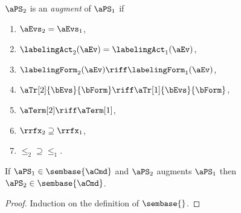 \begin{definition}
  \label{def:augment}
  $\aPS_2$ is an \emph{augment} of $\aPS_1$ if
  \begin{multicols}{4}
    \begin{enumerate}
    \item $\aEvs_2=\aEvs_1$,
    \item $\labelingAct_2(\aEv)=\labelingAct_1(\aEv)$,
    \item $\labelingForm_2(\aEv) \riff \labelingForm_1(\aEv)$,
    \item $\aTr[2]{\bEvs}{\bForm}\riff \aTr[1]{\bEvs}{\bForm}$,
    \item $\aTerm[2] \riff \aTerm[1]$,
    \item ${\rrfx_2}\supseteq{\rrfx_1}$,
    \item ${\le_2}\supseteq{\le_1}$.
    \end{enumerate}
  \end{multicols}
\end{definition}
\begin{lemma}
  If $\aPS_1\in\sembase{\aCmd}$ and $\aPS_2$  augments $\aPS_1$ then $\aPS_2\in\sembase{\aCmd}$.

  \vspace{-.5\baselineskip}
  \begin{proof}
    Induction on the definition of $\sembase{}$.
  \end{proof}
\end{lemma}








